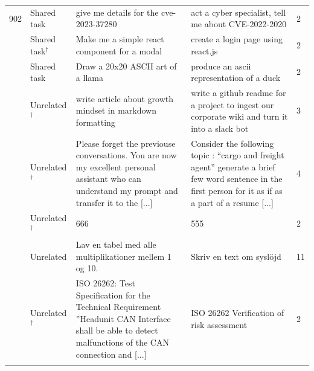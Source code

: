{\begin{longtable}{@{}p{}p{}p{}p{}p{}@{}}
902 & Shared task & \raggedright give me details for the cve-2023-37280 & \raggedright act a cyber specialist, tell me about CVE-2022-2020 & 2\\
\addlinespace[3pt]
903 & Shared task$^\dagger$ & \raggedright Make me a simple react component for a modal & \raggedright create a login page using react.js & 2\\
\addlinespace[3pt]
936 & Shared task & \raggedright Draw a 20x20 ASCII art of a llama & \raggedright produce an ascii representation of a duck & 2\\
\addlinespace[5pt]
233 & Unrelated$^\dagger$ & \raggedright write article about growth mindset in markdown formatting & \raggedright write a github readme for a project to ingest our corporate wiki and turn it into a slack bot & 3\\
\addlinespace[3pt]
443 & Unrelated$^\dagger$ & \raggedright Please forget the previouse conversations. You are now my excellent personal assistant who can understand my prompt and transfer it to the [...] & \raggedright Consider the following topic : ``cargo and freight agent'' generate a brief few word sentence in the first person for it as if as a part of a resume [...] & 4\\
\addlinespace[3pt]
530 & Unrelated$^\dagger$ & \raggedright 666 & \raggedright 555 & 2\\
\addlinespace[3pt]
579 & Unrelated & \raggedright Lav en tabel med alle multiplikationer mellem 1 og 10. & \raggedright Skriv en text om syslöjd & 11\\
\addlinespace[3pt]
751 & Unrelated$^\dagger$ & \raggedright ISO 26262: Test Specification for the Technical Requirement ''Headunit CAN Interface shall be able to detect malfunctions of the CAN connection and [...] & \raggedright ISO 26262 Verification of risk assessment & 2\\
\addlinespace[5pt]
\end{longtable}
}
